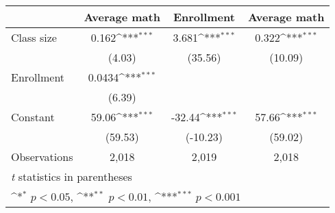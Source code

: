 {
\def\sym#1{\ifmmode^{#1}\else\(^{#1}\)\fi}
\begin{tabular}{l*{3}{c}}
\hline\hline
          &\multicolumn{1}{c}{Average math}&\multicolumn{1}{c}{Enrollment}&\multicolumn{1}{c}{Average math}\\
\hline
Class size&    0.162\sym{***}&    3.681\sym{***}&    0.322\sym{***}\\
          &   (4.03)         &  (35.56)         &  (10.09)         \\
Enrollment&   0.0434\sym{***}&                  &                  \\
          &   (6.39)         &                  &                  \\
Constant  &    59.06\sym{***}&   -32.44\sym{***}&    57.66\sym{***}\\
          &  (59.53)         & (-10.23)         &  (59.02)         \\
\hline
Observations&    2,018         &    2,019         &    2,018         \\
\hline\hline
\multicolumn{4}{l}{\footnotesize \textit{t} statistics in parentheses}\\
\multicolumn{4}{l}{\footnotesize \sym{*} \(p<0.05\), \sym{**} \(p<0.01\), \sym{***} \(p<0.001\)}\\
\end{tabular}
}

